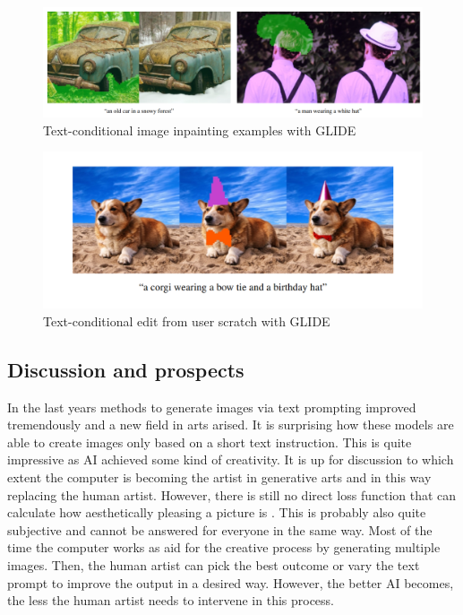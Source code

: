 \documentclass[
]{krantz}
\begin{document}
\begin{figure}

{\centering \includegraphics[width=0.9\linewidth]{./figures/03-chapter3/Impainting_GLIDE} 

}

\caption{Text-conditional image inpainting examples with GLIDE \citep{GLIDE}}\label{fig:inpainting}
\end{figure}



\begin{figure}

{\centering \includegraphics[width=0.9\linewidth]{./figures/03-chapter3/GLIDE_sketch} 

}

\caption{Text-conditional edit from user scratch with GLIDE \citep{GLIDE}}\label{fig:sketch}
\end{figure}



\hypertarget{discussion-and-prospects}{%
\subsection{Discussion and prospects}\label{discussion-and-prospects}}

In the last years methods to generate images via text prompting improved tremendously and a new field in arts arised. It is surprising how these models are able to create images only based on a short text instruction. This is quite impressive as AI achieved some kind of creativity. It is up for discussion to which extent the computer is becoming the artist in generative arts and in this way replacing the human artist. However, there is still no direct loss function that can calculate how aesthetically pleasing a picture is \citep{bias}. This is probably also quite subjective and cannot be answered for everyone in the same way. Most of the time the computer works as aid for the creative process by generating multiple images. Then, the human artist can pick the best outcome or vary the text prompt to improve the output in a desired way. However, the better AI becomes, the less the human artist needs to intervene in this process.
\end{document}
